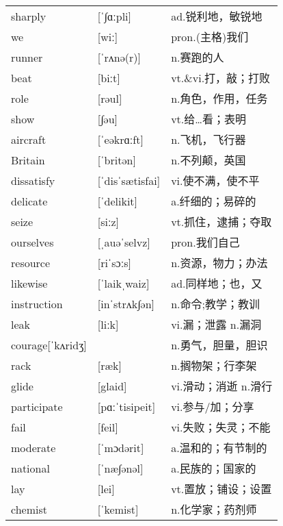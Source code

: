 \documentclass[a4paper]{article}
\begin{document}
\section{}
\begin{tabular}{l l l}

sharply & [ˈ∫ɑːpli] & ad.锐利地，敏锐地 \\
we & [wiː] & pron.(主格)我们 \\
runner & [ˈrʌnə(r)] & n.赛跑的人 \\
beat & [biːt] & vt.\&vi.打，敲；打败 \\
role & [rəul] & n.角色，作用，任务 \\
show & [∫əu] & vt.给…看；表明 \\
aircraft & [ˈeəkrɑːft] & n.飞机，飞行器 \\
Britain & [ˈbritən] & n.不列颠，英国 \\
dissatisfy & [ˈdisˈsætisfai] & vi.使不满，使不平 \\
delicate & [ˈdelikit] & a.纤细的；易碎的 \\
seize & [siːz] & vt.抓住，逮捕；夺取 \\
ourselves & [ˌauəˈselvz] & pron.我们自己 \\
resource & [riˈsɔːs] & n.资源，物力；办法 \\
likewise & [ˈlaikˌwaiz] & ad.同样地；也，又 \\
instruction & [inˈstrʌk∫ən] & n.命令;教学；教训 \\
leak & [liːk] & vi.漏；泄露 n.漏洞 \\
courage[ˈkʌridʒ] &  & n.勇气，胆量，胆识 \\
rack & [ræk] & n.搁物架；行李架 \\
glide & [glaid] & vi.滑动；消逝 n.滑行 \\
participate & [pɑːˈtisipeit] & vi.参与/加；分享 \\
fail & [feil] & vi.失败；失灵；不能 \\
moderate & [ˈmɔdərit] & a.温和的；有节制的 \\
national & [ˈnæ∫ənəl] & a.民族的；国家的 \\
lay & [lei] & vt.置放；铺设；设置 \\
chemist & [ˈkemist] & n.化学家；药剂师 \\

\end{tabular}
\end{document}
